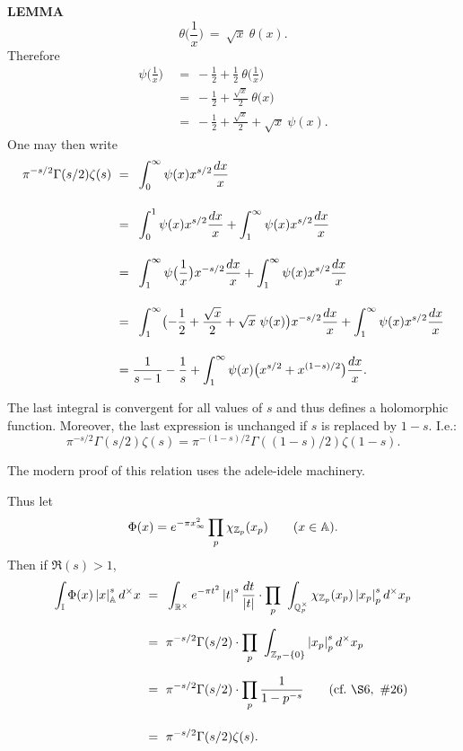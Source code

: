 \begin{x}{\small\bf LEMMA} \ %
\[
\theta\bigl(\frac{1}{x}\bigr) \ =\  \sqrt{x}\  \theta(x).
\]
Therefore
\begin{align*}
\psi\bigl(\frac{1}{x}\bigr) 	\ 
&=\  -\frac{1}{2} + \frac{1}{2} \ \theta\bigl(\frac{1}{x}\bigr)\\	
&=\  -\frac{1}{2} + \frac{\sqrt{x}}{2} \ \theta\bigl(x\bigr)\\
&=\  -\frac{1}{2} + \frac{\sqrt{x}}{2} + \sqrt{x}\ \psi(x).		
\end{align*}
One may then write
\begin{align*}
\pi^{-s/2}\Gamma(s/2)\zeta(s) \ 
&=\vsx\  \int_0^\infty \psi(x) x^{s/2} \frac{dx}{x}\\	
&=\vsx\  \int_0^1 \psi(x) x^{s/2} \frac{dx}{x} +  \int_1^\infty \psi(x) x^{s/2} \frac{dx}{x}\\
&=\vsx\  \int_1^\infty  \psi\bigl(\frac{1}{x}\bigr) x^{-s/2} \frac{dx}{x} +  \int_1^\infty \psi(x) x^{s/2} \frac{dx}{x}\\
&=\vsx\  \int_1^\infty  \bigl(-\frac{1}{2} + \frac{\sqrt{x}}{2} + \sqrt{x} \ \psi(x)\bigr) x^{-s/2} \frac{dx}{x} + 
\int_1^\infty \psi(x) x^{s/2} \frac{dx}{x}\\	
&= \frac{1}{s-1} - \frac{1}{s} + \int_1^\infty \psi(x) \bigl(x^{s/2} + x^{(1-s)/2}\bigr) \frac{dx}{x}.			
\end{align*}

The last integral is convergent for all values of $s$ and thus defines a holomorphic function.  
Moreover, the last expression is unchanged if $s$ is replaced by $1-s$.  I.e.:
\[
\pi^{-s/2}\Gamma(s/2)\zeta(s) = \pi^{-(1-s)/2}\Gamma((1-s)/2)\zeta(1-s).
\]

\vspace{0.1cm}

The modern proof of this relation uses the adele-idele machinery.  

Thus let
\[
\Phi(x) = e^{-\pi x_\infty^2} \prod_p \chi_{\mathbb{Z}_p} (x_p) 	\qquad (x \in \mathbb{A}).
\]
Then if $\Re(s) > 1$,
\begin{align*}
\int_\I \Phi(x) \abs{x}_\A^s d^\times x	\ 
&=\vsx\  \int_{\R^\times} e^{-\pi t^2} \abs{t}^s \frac{dt}{\abs{t}} \cdot \prod_p \  \int_{\Q_p^\times} \chi_{\Z_p} (x_p) \abs{x_p}_p^s d^\times x_p\\													
&=\vsx\  \pi^{-s/2}\Gamma(s/2) \cdot \prod_p \ \int_{\Z_p-\{0\}}  \abs{x_p}_p^s d^\times x_p\\	
&=\vsx\  \pi^{-s/2}\Gamma(s/2) \cdot \prod_p \frac{1}{1 - p^{-s}} \qquad (\text{cf.} \  \S6, \ \#26) \\	
&=\vsx\  \pi^{-s/2}\Gamma(s/2) \zeta(s).
\end{align*}


\end{x}
